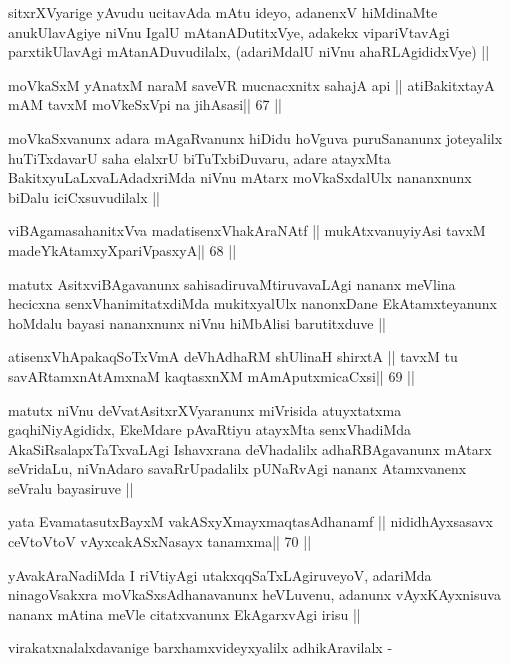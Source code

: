\begin{artha}
sitxrXVyarige yAvudu ucitavAda mAtu ideyo, adanenxV hiMdinaMte
anukUlavAgiye niVnu IgalU mAtanADutitxVye, adakekx vipariVtavAgi
parxtikUlavAgi mAtanADuvudilalx, (adariMdalU niVnu ahaRLAgididxVye) ||
\end{artha}

\begin{shl}
moVkaSxM yAnatxM naraM saveVR mucnacxnitx sahajA api ||
atiBakitxtayA mAM tavxM moVkeSxV\s pi na jihAsasi\hfill || 67 ||
\end{shl}

\begin{artha}
moVkaSxvanunx adara mAgaRvanunx hiDidu hoVguva puruSananunx joteyalilx
huTiTxdavarU saha elalxrU biTuTxbiDuvaru, adare atayxMta
BakitxyuLaLxvaLAdadxriMda niVnu mAtarx moVkaSxdalUlx nananxnunx biDalu
iciCxsuvudilalx ||
\end{artha}

\begin{shl}
viBAgamasahanitxVva madatisenxVhakAraNAtf ||
mukAtxvanuyiyAsi tavxM madeYkAtamxyXpariVpasxyA\hfill || 68 ||
\end{shl}

\begin{artha}
matutx AsitxviBAgavanunx sahisadiruvaMtiruvavaLAgi nananx meVlina
hecicxna senxVhanimitatxdiMda mukitxyalUlx nanonxDane EkAtamxteyanunx
hoMdalu bayasi nananxnunx niVnu hiMbAlisi barutitxduve ||
\end{artha}

\begin{shl}
atisenxVhA\s pakaqSoTxVmA deVhAdhaRM shUlinaH shirxtA ||
tavxM tu savARtamxnA\s\s tAmxnaM kaqtasxnXM mAmAputxmicaCxsi\hfill || 69 ||
\end{shl}

\begin{artha}
matutx niVnu deVvatAsitxrXVyaranunx miVrisida atuyxtatxma
gaqhiNiyAgididx, EkeMdare pAvaRtiyu atayxMta senxVhadiMda
AkaSiRsalapxTaTxvaLAgi Ishavxrana deVhadalilx adhaRBAgavanunx mAtarx
seVridaLu, niVnAdaro savaRrUpadalilx pUNaRvAgi nananx Atamxvanenx
seVralu bayasiruve ||
\end{artha}

\begin{shl}
yata EvamatasutxBayxM vakASxyXmayxmaqtasAdhanamf ||
nididhAyxsasavx ceVtoV\s toV vAyxcakASxNasayx tanamxma\hfill || 70 ||
\end{shl}

\begin{artha}
yAvakAraNadiMda I riVtiyAgi utakxqqSaTxLAgiruveyoV, adariMda
ninagoVsakxra moVkaSxsAdhanavanunx heVLuvenu, adanunx vAyxKAyxnisuva
nananx mAtina meVle citatxvanunx EkAgarxvAgi irisu ||

virakatxnalalxdavanige barxhamxvideyxyalilx adhikAravilalx -
\end{artha}

